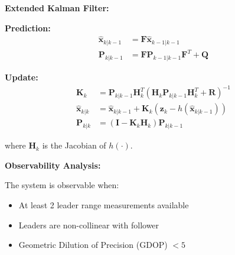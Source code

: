 \vspace{0.3em}

\textbf{Extended Kalman Filter:}

\textbf{Prediction:}
\begin{align}
\hat{\mathbf{x}}_{k|k-1} &= \mathbf{F} \hat{\mathbf{x}}_{k-1|k-1} \\
\mathbf{P}_{k|k-1} &= \mathbf{F} \mathbf{P}_{k-1|k-1} \mathbf{F}^T + \mathbf{Q}
\end{align}

\textbf{Update:}
\begin{align}
\mathbf{K}_k &= \mathbf{P}_{k|k-1} \mathbf{H}_k^T (\mathbf{H}_k \mathbf{P}_{k|k-1} \mathbf{H}_k^T + \mathbf{R})^{-1} \\
\hat{\mathbf{x}}_{k|k} &= \hat{\mathbf{x}}_{k|k-1} + \mathbf{K}_k (\mathbf{z}_k - h(\hat{\mathbf{x}}_{k|k-1})) \\
\mathbf{P}_{k|k} &= (\mathbf{I} - \mathbf{K}_k \mathbf{H}_k) \mathbf{P}_{k|k-1}
\end{align}

where $\mathbf{H}_k$ is the Jacobian of $h(\cdot)$.

\vspace{0.3em}

\textbf{Observability Analysis:}

The system is observable when:
\begin{itemize}[leftmargin=1em, itemsep=0.05em]
    \item At least 2 leader range measurements available
    \item Leaders are non-collinear with follower
    \item Geometric Dilution of Precision (GDOP) $< 5$
\end{itemize}

